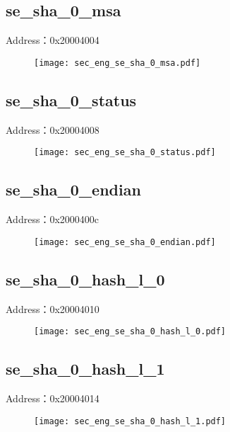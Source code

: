 \subsection{se\_sha\_0\_msa}
\label{sec_eng-se-sha-0-msa}
Address：0x20004004
 \begin{figure}[H]
\texttt{[image: sec\_eng\_se\_sha\_0\_msa.pdf]}
\end{figure}

\subsection{se\_sha\_0\_status}
\label{sec_eng-se-sha-0-status}
Address：0x20004008
 \begin{figure}[H]
\texttt{[image: sec\_eng\_se\_sha\_0\_status.pdf]}
\end{figure}

\subsection{se\_sha\_0\_endian}
\label{sec_eng-se-sha-0-endian}
Address：0x2000400c
 \begin{figure}[H]
\texttt{[image: sec\_eng\_se\_sha\_0\_endian.pdf]}
\end{figure}

\subsection{se\_sha\_0\_hash\_l\_0}
\label{sec_eng-se-sha-0-hash-l-0}
Address：0x20004010
 \begin{figure}[H]
\texttt{[image: sec\_eng\_se\_sha\_0\_hash\_l\_0.pdf]}
\end{figure}

\subsection{se\_sha\_0\_hash\_l\_1}
\label{sec_eng-se-sha-0-hash-l-1}
Address：0x20004014
 \begin{figure}[H]
\texttt{[image: sec\_eng\_se\_sha\_0\_hash\_l\_1.pdf]}
\end{figure}

